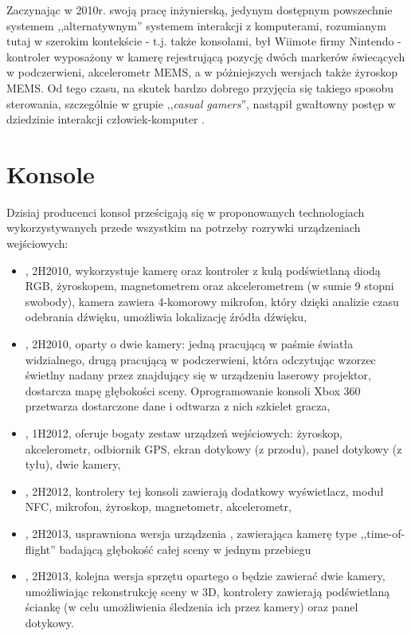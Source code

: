 \label{ch:current_state}

Zaczynając w 2010r. swoją pracę inżynierską, jedynym dostępnym powszechnie systemem ,,alternatywnym'' systemem interakcji z komputerami, rozumianym tutaj w szerokim kontekście - t.j. także konsolami, był Wiimote firmy Nintendo - kontroler wyposażony w kamerę rejestrującą pozycję dwóch markerów świecących w podczerwieni, akcelerometr MEMS, a w póżniejszych wersjach także żyroskop MEMS. Od tego czasu, na skutek bardzo dobrego przyjęcia się takiego sposobu sterowania, szczególnie w grupie ,,\textit{casual gamers}'', nastąpił gwałtowny postęp w dziedzinie interakcji człowiek-komputer \cite{hcibook,reachout,movtar,behuman}.\\

\section{Konsole}

Dzisiaj producenci konsol prześcigają się w proponowanych technologiach wykorzystywanych przede wszystkim na potrzeby rozrywki urządzeniach wejściowych:
\begin{itemize}
 \item {}, 2H2010, wykorzystuje kamerę oraz kontroler z kulą podświetlaną diodą RGB, żyroskopem, magnetometrem oraz akcelerometrem (w sumie 9 stopni swobody), kamera zawiera 4-komorowy mikrofon, który dzięki analizie czasu odebrania dźwięku, umożliwia lokalizację źródła dźwięku,
 \item {}, 2H2010, oparty o dwie kamery: jedną pracującą w paśmie światła widzialnego, drugą pracującą w podczerwieni, która odczytując wzorzec świetlny nadany przez znajdujący się w urządzeniu laserowy projektor, dostarcza mapę głębokości sceny. Oprogramowanie konsoli Xbox 360 przetwarza dostarczone dane i odtwarza z nich szkielet gracza,
 \item {}, 1H2012, oferuje bogaty zestaw urządzeń wejściowych: żyroskop, akcelerometr, odbiornik GPS, ekran dotykowy (z przodu), panel dotykowy (z tyłu), dwie kamery,
 \item {}, 2H2012, kontrolery tej konsoli zawierają dodatkowy wyświetlacz, moduł NFC, mikrofon, żyroskop, magnetometr, akcelerometr,
 \item {}, 2H2013, usprawniona wersja urządzenia , zawierająca kamerę type ,,time-of-flight'' badającą głębokość całej sceny w jednym przebiegu
 \item {}, 2H2013, kolejna wersja sprzętu opartego o  będzie zawierać dwie kamery, umożliwiając rekonstrukcję sceny w 3D, kontrolery zawierają  podświetlaną ściankę (w celu umożliwienia śledzenia ich przez kamery) oraz panel dotykowy.
\end{itemize}

